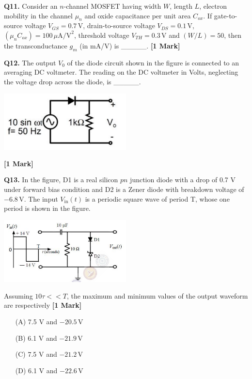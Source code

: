 \documentclass[11pt]{article}
\newcommand{\questiona}[2]{
    \noindent\textbf{Q#2.} #1 \hfill \textbf{[1 Mark]}
}
\begin{document}
\vspace{0.5cm}

\questiona{Consider an $n$-channel MOSFET having width $W$, length $L$, electron mobility in the channel $\mu_n$ and oxide capacitance per unit area $C_{ox}$. If gate-to-source voltage $V_{GS} = 0.7\,\text{V}$, drain-to-source voltage $V_{DS} = 0.1\,\text{V}$, $(\mu_n C_{ox}) = 100\,\mu\text{A/V}^2$, threshold voltage $V_{TH} = 0.3\,\text{V}$ and $(W/L) = 50$, then the transconductance $g_m$ (in mA/V) is \_\_\_\_\_.}{11}

\vspace{0.5cm}

\questiona{The output $V_0$ of the diode circuit shown in the figure is connected to an averaging DC voltmeter. The reading on the DC voltmeter in Volts, neglecting the voltage drop across the diode, is \_\_\_\_\_.
\begin{center}
\includegraphics[width=0.5\textwidth]{figures/12.png}
\end{center}}{12}

\vspace{0.5cm}

\questiona{In the figure, D1 is a real silicon $pn$ junction diode with a drop of 0.7 V under forward bias condition and D2 is a Zener diode with breakdown voltage of $-6.8\,\text{V}$. The input $V_{\text{in}}(t)$ is a periodic square wave of period T, whose one period is shown in the figure.
\begin{center}
\includegraphics[width=0.5\textwidth]{figures/13.png}
\end{center}
Assuming $10\tau << T$, the maximum and minimum values of the output waveform are respectively}{13}
\begin{enumerate}
    \item[(A)] 7.5 V and $-20.5\,\text{V}$
    \item[(B)] 6.1 V and $-21.9\,\text{V}$
    \item[(C)] 7.5 V and $-21.2\,\text{V}$
    \item[(D)] 6.1 V and $-22.6\,\text{V}$
\end{enumerate}
\end{document}
